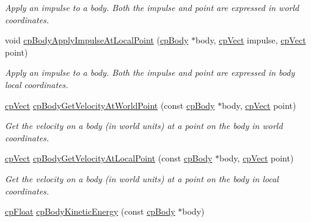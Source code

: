 \begin{DoxyCompactItemize}
\begin{DoxyCompactList}\small\item\em Apply an impulse to a body. Both the impulse and point are expressed in world coordinates. \end{DoxyCompactList}\item 
\hypertarget{group__cp_body_gaf05c7bb86a5d5be5434ad7d051779902}{}void \hyperlink{group__cp_body_gaf05c7bb86a5d5be5434ad7d051779902}{cp\+Body\+Apply\+Impulse\+At\+Local\+Point} (\hyperlink{structcp_body}{cp\+Body} $\ast$body, \hyperlink{structcp_vect}{cp\+Vect} impulse, \hyperlink{structcp_vect}{cp\+Vect} point)\label{group__cp_body_gaf05c7bb86a5d5be5434ad7d051779902}

\begin{DoxyCompactList}\small\item\em Apply an impulse to a body. Both the impulse and point are expressed in body local coordinates. \end{DoxyCompactList}\item 
\hypertarget{group__cp_body_ga39154cbd06af7a5c097d3ae979ae312d}{}\hyperlink{structcp_vect}{cp\+Vect} \hyperlink{group__cp_body_ga39154cbd06af7a5c097d3ae979ae312d}{cp\+Body\+Get\+Velocity\+At\+World\+Point} (const \hyperlink{structcp_body}{cp\+Body} $\ast$body, \hyperlink{structcp_vect}{cp\+Vect} point)\label{group__cp_body_ga39154cbd06af7a5c097d3ae979ae312d}

\begin{DoxyCompactList}\small\item\em Get the velocity on a body (in world units) at a point on the body in world coordinates. \end{DoxyCompactList}\item 
\hypertarget{group__cp_body_ga6fd515f415753ae6ac05ecbd393a19a6}{}\hyperlink{structcp_vect}{cp\+Vect} \hyperlink{group__cp_body_ga6fd515f415753ae6ac05ecbd393a19a6}{cp\+Body\+Get\+Velocity\+At\+Local\+Point} (const \hyperlink{structcp_body}{cp\+Body} $\ast$body, \hyperlink{structcp_vect}{cp\+Vect} point)\label{group__cp_body_ga6fd515f415753ae6ac05ecbd393a19a6}

\begin{DoxyCompactList}\small\item\em Get the velocity on a body (in world units) at a point on the body in local coordinates. \end{DoxyCompactList}\item 
\hypertarget{group__cp_body_ga18c62a6644b97134f5d1960391af3719}{}\hyperlink{group__basic_types_gac1ed65573e035bf892505768c852d8d3}{cp\+Float} \hyperlink{group__cp_body_ga18c62a6644b97134f5d1960391af3719}{cp\+Body\+Kinetic\+Energy} (const \hyperlink{structcp_body}{cp\+Body} $\ast$body)\label{group__cp_body_ga18c62a6644b97134f5d1960391af3719}


\end{DoxyCompactItemize}
